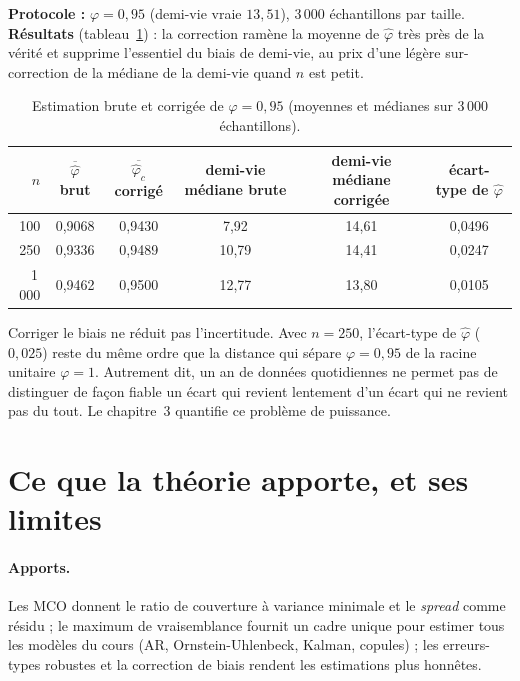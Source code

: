 \begin{codebox}
\textbf{Protocole :} $\varphi = 0{,}95$ (demi-vie vraie $13{,}51$), 3\,000 échantillons par taille. \textbf{Résultats} (tableau~\ref{c2:tab:kendall}) : la correction ramène la moyenne de $\hat\varphi$ très près de la vérité et supprime l'essentiel du biais de demi-vie, au prix d'une légère sur-correction de la médiane de la demi-vie quand $n$ est petit.
\end{codebox}

\begin{table}[h]
\centering\small
\caption{Estimation brute et corrigée de $\varphi = 0{,}95$ (moyennes et médianes sur 3\,000 échantillons).}
\label{c2:tab:kendall}
\begin{tabular}{rccccc}
\toprule
$n$ & $\overline{\hat\varphi}$ brut & $\overline{\hat\varphi_c}$ corrigé & demi-vie médiane brute & demi-vie médiane corrigée & écart-type de $\hat\varphi$\\
\midrule
100 & 0,9068 & 0,9430 & 7,92 & 14,61 & 0,0496\\
250 & 0,9336 & 0,9489 & 10,79 & 14,41 & 0,0247\\
1\,000 & 0,9462 & 0,9500 & 12,77 & 13,80 & 0,0105\\
\bottomrule
\end{tabular}
\end{table}

\begin{pitfall}
Corriger le biais ne réduit pas l'incertitude. Avec $n = 250$, l'écart-type de $\hat\varphi$ ($0{,}025$) reste du même ordre que la distance qui sépare $\varphi = 0{,}95$ de la racine unitaire $\varphi = 1$. Autrement dit, un an de données quotidiennes ne permet pas de distinguer de façon fiable un écart qui revient lentement d'un écart qui ne revient pas du tout. Le chapitre~3 quantifie ce problème de puissance.
\end{pitfall}

\section{Ce que la théorie apporte, et ses limites}

\paragraph{Apports.} Les MCO donnent le ratio de couverture à variance minimale et le \emph{spread} comme résidu ; le maximum de vraisemblance fournit un cadre unique pour estimer tous les modèles du cours (AR, Ornstein-Uhlenbeck, Kalman, copules) ; les erreurs-types robustes et la correction de biais rendent les estimations plus honnêtes.

